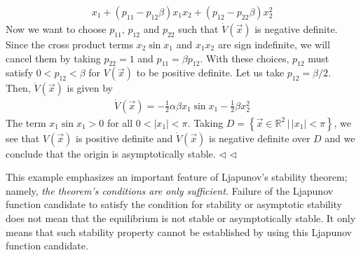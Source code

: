 \documentclass[12pt,a4paper,oneside]{book}
\begin{document}
\begin{onehalfspace}
\begin{example}
\begin{equation*}
\begin{aligned}
			x_1+(p_{11}-p_{12}\beta)x_1x_2+(p_{12}-p_{22}\beta)x_2^2
		\end{aligned}
	\end{equation*}
	Now we want to choose $p_{11},\,p_{12}$ and $p_{22}$ such that 
	$\dot{V}(\vec{x})$ is negative definite. Since the cross product terms 
	$x_2\sin x_1$ and $x_1x_2$ are sign indefinite, we will cancel them by 
	taking $p_{22}=1$ and $p_{11}=\beta p_{12}$. With these choices, $p_{12}$ 
	must satisfy $0<p_{12}<\beta$ for $V(\vec{x})$ to be positive definite. Let 
	us take $p_{12}=\beta/2$. Then, $\dot{V}(\vec{x})$ is given by
	\begin{equation*}
		\begin{aligned}
			\dot{V}(\vec{x})=-\frac{1}{2}\alpha\beta x_1\sin x_1-\frac{1}{2} 
			\beta x_2^2
		\end{aligned}
	\end{equation*}
	The term $x_1\sin x_1>0$ for all $0<|x_1|<\pi$. Taking $D=\left\lbrace 
	\vec{x}\in\mathbb{R}^2\,|\,|x_1|<\pi\right\rbrace $, we see that 
	$V(\vec{x})$ is positive definite and $\dot{V}(\vec{x})$ is negative 
	definite over $D$ and we conclude that the origin is asymptotically stable. 
	$\triangleleft$
$\triangleleft$ \end{example}
This example emphasizes an important feature of Ljapunov's stability theorem; 
namely, \textit{the theorem's conditions are only sufficient.} Failure of the 
Ljapunov function candidate to satisfy the condition for stability or 
asymptotic stability does not mean that the equilibrium is not stable or 
asymptotically stable. It only means that such stability property cannot be 
established by using this Ljapunov function candidate. 


\end{onehalfspace}
\end{document}
